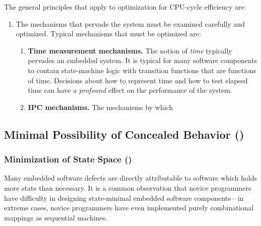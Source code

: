 The general principles that apply to optimization for CPU-cycle efficiency are:

\begin{enumerate}
\item The mechanisms that pervade the system must be examined carefully and
      optimized.  Typical mechanisms that must be optimized are:

	  \begin{enumerate}
	  \item \textbf{Time measurement mechanisms.}
	        The notion of \emph{time} typically pervades an
			embedded system.  It is typical for many 
			software components to contain state-machine logic
			with transition functions that are functions of time.
			Decisions about how to represent time and how to test
			elapsed time can have a \emph{profound} effect on 
			the performance of the system.
      \item \textbf{IPC mechanisms.}
	        The mechanisms by which 
	  \end{enumerate}
\end{enumerate}


\subsection[Minimal Possibility of Concealed Behavior]
           {Minimal Possibility of Concealed Behavior 
           ()}
\label{chgr0:sdda0:mpc0}


\subsubsection[Minimization of State Space]
              {Minimization of State Space 
              ()}
\label{chgr0:sdda0:mpc0:mss0}

Many embedded software defects are directly attributable to software which
holds more state than necessary.  It is a common observation that
novice programmers have difficulty in designing state-minimal 
embedded software components---in extreme cases, novice programmers have
even implemented purely combinational mappings as sequential machines.

